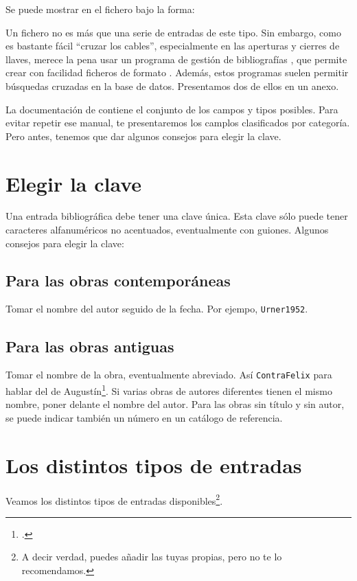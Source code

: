 Se puede mostrar en el fichero  bajo la forma:

\begin{quotation}
\cite{Urner1952}
\end{quotation}


Un fichero  no es más que una serie de entradas de este tipo. Sin embargo, como es bastante fácil \enquote{cruzar los cables}, especialmente en las aperturas y cierres de llaves, merece la pena usar un programa de gestión de bibliografías , que permite crear con facilidad ficheros de formato . Además, estos programas suelen permitir búsquedas cruzadas en la base de datos. Presentamos dos de ellos en un anexo.

La documentación de  contiene el conjunto de los campos y tipos posibles. Para evitar repetir ese manual, te presentaremos los camplos clasificados por categoría. Pero antes, tenemos que dar algunos consejos para elegir la clave.

\section{Elegir la clave}

Una entrada bibliográfica debe tener una clave única. Esta clave sólo puede tener caracteres alfanuméricos no acentuados, eventualmente con guiones. 
Algunos consejos para elegir la clave:
\subsection{Para las obras contemporáneas}
Tomar el nombre del autor seguido de la fecha. Por ejempo, \verb|Urner1952|.

\subsection{Para las obras antiguas}

Tomar el nombre de la obra, eventualmente abreviado. Así \verb|ContraFelix| para hablar del  de Augustín\footcite{ContraFelix}. Si varias obras de autores diferentes tienen el mismo nombre, poner delante el nombre del autor. Para las obras sin título  y sin autor, se puede indicar también un número en un catálogo de referencia.



\section{Los distintos tipos de entradas}
Veamos los distintos tipos de entradas disponibles\footnote{A decir verdad, puedes añadir las tuyas propias, pero no te lo recomendamos.}.


